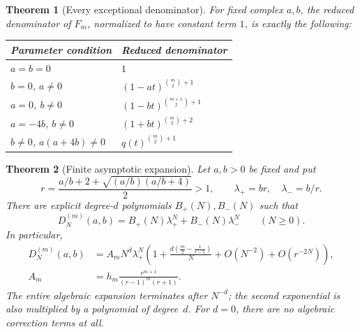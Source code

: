 \documentclass[11pt,a4paper]{article}
\numberwithin{equation}{section}
\newtheorem{theorem}{Theorem}[section]
\theoremstyle{definition}
\theoremstyle{remark}
\newcommand{\D}[2]{D_{#1}^{(#2)}}
\begin{document}
\begin{theorem}[Every exceptional denominator]\label{thm:exceptional}
For fixed complex $a,b$, the reduced denominator of $F_m$, normalized to
have constant term $1$, is exactly the following:
\begin{center}
\renewcommand{\arraystretch}{1.35}
\begin{tabular}{@{}ll@{}}
\toprule
Parameter condition & Reduced denominator\\
\midrule
$a=b=0$ & $1$\\
$b=0$, $a\ne0$ & $(1-at)^{\binom m2+1}$\\
$a=0$, $b\ne0$ & $(1-bt)^{\binom{m+1}{2}+1}$\\
$a=-4b$, $b\ne0$ & $(1+bt)^{\binom m2+2}$\\
$b\ne0$, $a(a+4b)\ne0$ & $q(t)^{\binom m2+1}$\\
\bottomrule
\end{tabular}
\end{center}
\end{theorem}

\begin{theorem}[Finite asymptotic expansion]\label{thm:asymp}
Let $a,b>0$ be fixed and put
\begin{equation}\label{eq:positive-roots}
 r=\frac{a/b+2+\sqrt{(a/b)(a/b+4)}}2>1,\qquad
 \lambda_+=br,\quad \lambda_-=b/r.
\end{equation}
There are explicit degree-$d$ polynomials $B_+(N),B_-(N)$ such that
\begin{equation}\label{eq:two-exp-statement}
 \D{N}{m}(a,b)=B_+(N)\lambda_+^N+B_-(N)\lambda_-^N
 \qquad(N\geq0).
\end{equation}
In particular,
\begin{align}
 \D{N}{m}(a,b)
 &=A_m N^d\lambda_+^N
 \left(1+\frac{d\left(\frac m2-\frac1{r-1}\right)}{N}
       +O(N^{-2})+O(r^{-2N})\right),\label{eq:asymp}\\
 A_m&=h_m\frac{r^{m+1}}{(r-1)^m(r+1)}.\label{eq:A}
\end{align}
The entire algebraic expansion terminates after $N^{-d}$; the second
exponential is also multiplied by a polynomial of degree~$d$.
For $d=0$, there are no algebraic correction terms at all.
\end{theorem}
\end{document}
